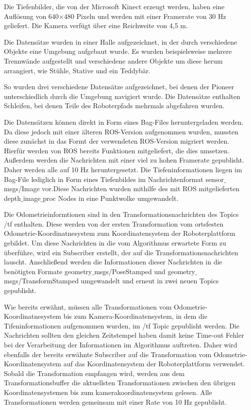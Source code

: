 Die Tiefenbilder, die von der Microsoft Kinect erzeugt werden, haben eine Auflösung von 640$\times$480 Pixeln und werden mit einer Framerate von 30 Hz geliefert. Die Kamera verfügt über eine Reichweite von 4,5 m.

Die Datensätze wurden in einer Halle aufgezeichnet, in der durch verschiedene Objekte eine Umgebung aufgebaut wurde. Es wurden beispielsweise mehrere Trennwände aufgestellt und verschiedene andere Objekte um diese herum arrangiert, wie Stühle, Stative und ein Teddybär. 

So wurden drei verschiedene Datensätze aufgezeichnet, bei denen der Pioneer unterschiedlich durch die Umgebung navigiert wurde. Die Datensätze enthalten Schleifen, bei denen Teile des Roboterpfads mehrmals abgefahren wurden. 

Die Datensätzen können direkt in Form eines Bag-Files heruntergeladen werden. Da diese jedoch mit einer älteren ROS-Version aufgenommen wurden, mussten diese zunächst in das Formt der verwendeten ROS-Version migriert werden. Hierfür werden von ROS bereits Funktionen mitgeliefert, die dies umsetzen. Außerdem werden die Nachrichten mit einer viel zu hohen Framerate gepublisht. Daher werden alle auf 10 Hz heruntergesetzt. Die Tiefeninformationen liegen im Bag-File lediglich in Form eines Tiefenbildes im Nachrichtenformat sensor$\_$msgs/Image vor.Diese Nachrichten wurden mithilfe des mit ROS mitgelieferten depth$\_$image$\_$proc Nodes in eine Punktwolke umgewandelt. 

Die Odometrieinformtionen sind in den Transformationsnachrichten des Topics /tf enthalten. Diese werden von der ersten Transformation vom ortsfesten Odometrie-Koordinatnesystem zum Koordinatensystem der Roboterplattform gebildet. Um diese Nachrichten in die vom Algorithmus erwartete Form zu überführe, wird ein Subscriber erstellt, der auf die Transformationsnachrichten lauscht. Anschließend werden die Informationen dieser Nachrichten in die benötigten Formate geometry$\_$msgs/PoseStamped und geometry$\_$msgs/TransformStamped umgewandelt und erneut in zwei neuen Topics gepublisht. 

Wie bereits erwähnt, müssen alle Transformationen vom Odometrie-Koordinatnesystem bis zum Kamera-Koordinatensystem, in dem die Tifeninformationen aufgenommen wurden, im /tf Topic gepublisht werden. Die Nachrichten sollten den gleichen Zeitstempel haben damit keine  Time-out Fehler bei der Verarbeitung der Informationen im Algorithmus auftreten. Daher wird ebenfalls der bereits erwähnte Subscriber auf die Transformation vom Odometrie-Koordinatensystem auf das Koordinatensystem der Roboterplattform verwendet. Sobald die Transformation empfangen wird, werden aus dem Transformationsbuffer die aktuellsten Transformationen zwischen den übrigen Koordinatensystemen bis zum kamerakoordinatensystem gelesen. Alle Transformationen werden gemeinsam  mit einer Rate von 10 Hz gepublisht. 

